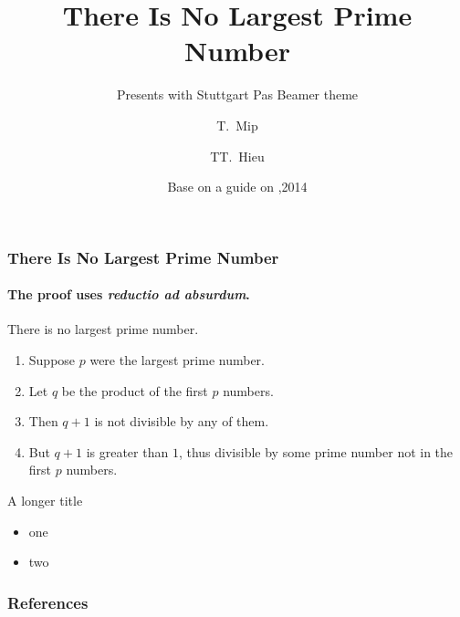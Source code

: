 \documentclass[
  xcolor={svgnames},
  hyperref={colorlinks,citecolor=DeepPink4,linkcolor=DarkRed,urlcolor=DarkBlue}
  ]{beamer}
\title[Largest Prime Number?] %
{There Is No Largest Prime Number}
\subtitle{Presents with Stuttgart Pas Beamer theme}
\author[tmip, hieutt] %
{T.~Mip\inst{1} \and TT.~Hieu\inst{2}}
\institute[Universities Here and There] %
{
  \inst{1}%
  Institute of Computer Science\\
  University Here
  \and
  \inst{2}%
  Institute of Theoretical Philosophy\\
  University There
}
\date[TX 2014] %
{Base on a guide on \cite{BaseOn},2014}
\begin{document}
\begin{frame}
\titlepage
\end{frame}


\begin{frame}
\frametitle{There Is No Largest Prime Number}
\framesubtitle{The proof uses \textit{reductio ad absurdum}.}
\begin{theorem}
There is no largest prime number. \end{theorem}
\begin{enumerate}
\item<1-| alert@1> Suppose $p$ were the largest prime number.
\item<2-> Let $q$ be the product of the first $p$ numbers.
\item<3-> Then $q+1$ is not divisible by any of them.
\item<1-> But $q + 1$ is greater than $1$, thus divisible by some prime
number not in the first $p$ numbers.
\end{enumerate}
\end{frame}

\begin{frame}{A longer title}
\begin{itemize}
\item one
\item two
\end{itemize}
\end{frame}


\begin{frame}[allowframebreaks]
   \frametitle{References}
   
   
\end{frame}
\end{document}
